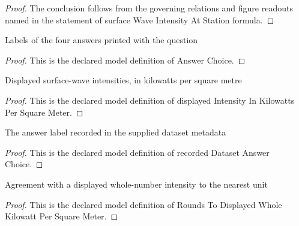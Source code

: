 \begin{proof}
  The conclusion follows from the governing relations and figure readouts named in the statement of surface Wave Intensity At Station formula.
\end{proof}
\begin{definition}
  \label{def:physics:phyx-mini-0326:phyxminiproblems-problemphyxmini0326-answerchoice}
  Labels of the four answers printed with the question
\end{definition}
\begin{proof}
  This is the declared model definition of Answer Choice.
\end{proof}
\begin{definition}
  \label{def:physics:phyx-mini-0326:phyxminiproblems-problemphyxmini0326-displayedintensityinkilowattspersquaremeter}
  Displayed surface-wave intensities, in kilowatts per square metre
\end{definition}
\begin{proof}
  This is the declared model definition of displayed Intensity In Kilowatts Per Square Meter.
\end{proof}
\begin{definition}
  \label{def:physics:phyx-mini-0326:phyxminiproblems-problemphyxmini0326-recordeddatasetanswerchoice}
  The answer label recorded in the supplied dataset metadata
\end{definition}
\begin{proof}
  This is the declared model definition of recorded Dataset Answer Choice.
\end{proof}
\begin{definition}
  \label{def:physics:phyx-mini-0326:phyxminiproblems-problemphyxmini0326-roundstodisplayedwholekilowattpersquaremeter}
  Agreement with a displayed whole-number intensity to the nearest unit
\end{definition}
\begin{proof}
  This is the declared model definition of Rounds To Displayed Whole Kilowatt Per Square Meter.
\end{proof}
